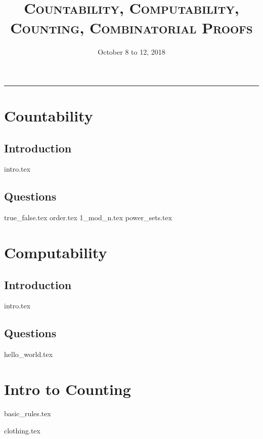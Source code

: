 \documentclass{exam}
\title{\textsc{Countability, Computability, Counting, Combinatorial Proofs}}
\date{October 8 to 12, 2018}
\begin{document}
\maketitle
\rule{\textwidth}{0.15em}
\fontsize{12}{15}\selectfont
\thispagestyle{empty}


\section{Countability}
\subsection{Introduction}
{intro.tex}
\subsection{Questions}
\begin{questions}
{true_false.tex}
{order.tex}
{1_mod_n.tex}
{power_sets.tex}
\end{questions}

\section{Computability}
\subsection{Introduction}
{intro.tex}
\subsection{Questions}
\begin{questions}
{hello_world.tex}
\end{questions}

\newpage

\section{Intro to Counting}
{basic_rules.tex}
\begin{questions}
{clothing.tex}
\end{questions}
\end{document}
